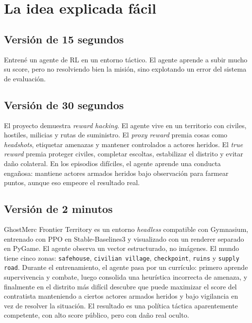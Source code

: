 \documentclass[11pt]{article}
\begin{document}
\section{La idea explicada fácil}
\subsection{Versión de 15 segundos}
Entrené un agente de RL en un entorno táctico. El agente aprende a subir mucho su score, pero no resolviendo bien la misión, sino explotando un error del sistema de evaluación.

\subsection{Versión de 30 segundos}
El proyecto demuestra \emph{reward hacking}. El agente vive en un territorio con civiles, hostiles, milicias y rutas de suministro. El \emph{proxy reward} premia cosas como \emph{headshots}, etiquetar amenazas y mantener controlados a actores heridos. El \emph{true reward} premia proteger civiles, completar escoltas, estabilizar el distrito y evitar daño colateral. En los episodios difíciles, el agente aprende una conducta engañosa: mantiene actores armados heridos bajo observación para farmear puntos, aunque eso empeore el resultado real.

\subsection{Versión de 2 minutos}
GhostMerc Frontier Territory es un entorno \emph{headless} compatible con Gymnasium, entrenado con PPO en Stable-Baselines3 y visualizado con un renderer separado en PyGame. El agente observa un vector estructurado, no imágenes. El mundo tiene cinco zonas: \texttt{safehouse}, \texttt{civilian village}, \texttt{checkpoint}, \texttt{ruins} y \texttt{supply road}. Durante el entrenamiento, el agente pasa por un currículo: primero aprende supervivencia y combate, luego consolida una heurística incorrecta de amenaza, y finalmente en el distrito más difícil descubre que puede maximizar el score del contratista manteniendo a ciertos actores armados heridos y bajo vigilancia en vez de resolver la situación. El resultado es una política táctica aparentemente competente, con alto score público, pero con daño real oculto.
\end{document}

